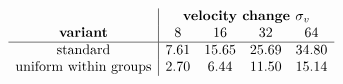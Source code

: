 $$\begin{array}{c|cccc}
& \multicolumn{4}{c}{\textbf{velocity change }\sigma_v} \\
\textbf{variant} & 8 & 16 & 32 & 64 \\ \hline
\text{standard} & 7.61 & 15.65 & 25.69 & 34.80\\
\text{uniform within groups} & 2.70 & 6.44 & 11.50 & 15.14
\end{array}$$
